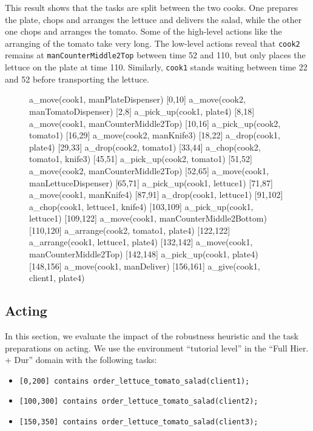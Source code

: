 This result shows that the tasks are split between the two cooks.
One prepares the plate, chops and arranges the lettuce and delivers the salad, while the other one chops and arranges the tomato.
Some of the high-level actions like the arranging of the tomato take very long.
The low-level actions reveal that \verb|cook2| remains at \verb|manCounterMiddle2Top| between time 52 and 110, but only places the lettuce on the plate at time 110.
Similarly, \verb|cook1| stands waiting between time 22 and 52 before transporting the lettuce.


\begin{figure}
  \begin{anmlcode}
  [0,2]     a_move(cook1, manPlateDispenser)
  [0,10]    a_move(cook2, manTomatoDispenser)
  [2,8]     a_pick_up(cook1, plate4)
  [8,18]    a_move(cook1, manCounterMiddle2Top)
  [10,16]   a_pick_up(cook2, tomato1)
  [16,29]   a_move(cook2, manKnife3)
  [18,22]   a_drop(cook1, plate4)
  [29,33]   a_drop(cook2, tomato1)
  [33,44]   a_chop(cook2, tomato1, knife3)
  [45,51]   a_pick_up(cook2, tomato1)
  [51,52]   a_move(cook2, manCounterMiddle2Top)
  [52,65]   a_move(cook1, manLettuceDispenser)
  [65,71]   a_pick_up(cook1, lettuce1)
  [71,87]   a_move(cook1, manKnife4)
  [87,91]   a_drop(cook1, lettuce1)
  [91,102]  a_chop(cook1, lettuce1, knife4)
  [103,109] a_pick_up(cook1, lettuce1)
  [109,122] a_move(cook1, manCounterMiddle2Bottom)
  [110,120] a_arrange(cook2, tomato1, plate4)
  [122,122] a_arrange(cook1, lettuce1, plate4)
  [132,142] a_move(cook1, manCounterMiddle2Top)
  [142,148] a_pick_up(cook1, plate4)
  [148,156] a_move(cook1, manDeliver)
  [156,161] a_give(cook1, client1, plate4)
  \end{anmlcode}
\end{figure}

\subsection{Acting}
\label{sec:evaluation-acting}

In this section, we evaluate the impact of the robustness heuristic and the task preparations on acting.
We use the environment ``tutorial level'' in the ``Full Hier. + Dur'' domain with the following tasks:
\begin{itemize}
  \item \verb|[0,200] contains order_lettuce_tomato_salad(client1);|
  \item \verb|[100,300] contains order_lettuce_tomato_salad(client2);|
  \item \verb|[150,350] contains order_lettuce_tomato_salad(client3);|
\end{itemize}

